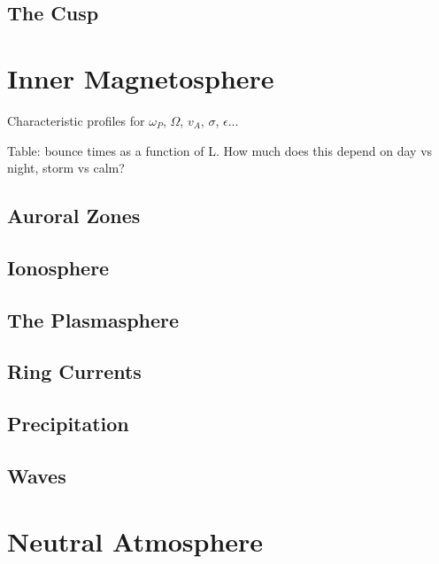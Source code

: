 \subsection{The Cusp}

\section{Inner Magnetosphere}

Characteristic profiles for $\omega_P$, $\Omega$, $v_A$, $\sigma$, $\epsilon$...

Table: bounce times as a function of L. How much does this depend on day vs night, storm vs calm? 

\subsection{Auroral Zones}

\subsection{Ionosphere}

\subsection{The Plasmasphere}

\subsection{Ring Currents}

\subsection{Precipitation}

\subsection{\Alfven Waves}


\section{Neutral Atmosphere}

